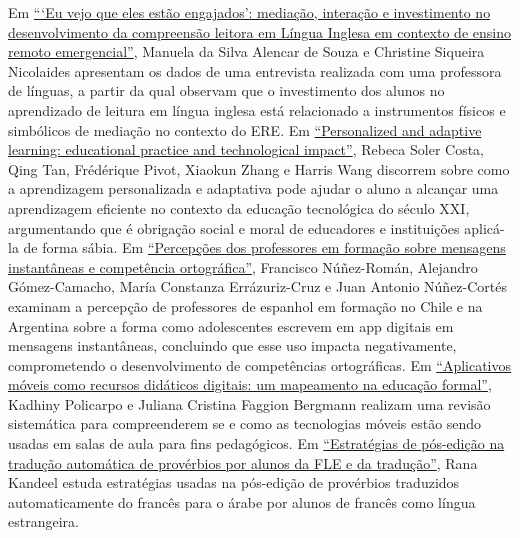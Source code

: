 \documentclass{textolivre}
\begin{document}
Em \href{https://doi.org/10.35699/1983-3652.2021.32572}{“‘Eu vejo que eles estão engajados’: mediação, interação e investimento no desenvolvimento da compreensão leitora em Língua Inglesa em contexto de ensino remoto emergencial”}, Manuela da Silva Alencar de Souza e Christine Siqueira Nicolaides apresentam os dados de uma entrevista realizada com uma professora de línguas, a partir da qual observam que o investimento dos alunos no aprendizado de leitura em língua inglesa está relacionado a instrumentos físicos e simbólicos de mediação no contexto do ERE. Em \href{https://doi.org/10.35699/1983-3652.2021.33445}{“Personalized and adaptive learning: educational practice and technological impact”}, Rebeca Soler Costa, Qing Tan, Frédérique Pivot, Xiaokun Zhang e Harris Wang discorrem sobre como a aprendizagem personalizada e adaptativa pode ajudar o aluno a alcançar uma aprendizagem eficiente no contexto da educação tecnológica do século XXI, argumentando que é obrigação social e moral de educadores e instituições aplicá-la de forma sábia. Em \href{https://doi.org/10.35699/1983-3652.2021.34141}{“Percepções dos professores em formação sobre mensagens instantâneas e competência ortográfica”}, Francisco Núñez-Román, Alejandro Gómez-Camacho, María Constanza Errázuriz-Cruz e Juan Antonio Núñez-Cortés examinam a percepção de professores de espanhol em formação no Chile e na Argentina sobre a forma como adolescentes escrevem em app digitais em mensagens instantâneas, concluindo que esse uso impacta negativamente, comprometendo o desenvolvimento de competências ortográficas. Em \href{https://doi.org/10.35699/1983-3652.2021.24923}{“Aplicativos móveis como recursos didáticos digitais: um mapeamento na educação formal”}, Kadhiny Policarpo e Juliana Cristina Faggion Bergmann realizam uma revisão sistemática para compreenderem se e como as tecnologias móveis estão sendo usadas em salas de aula para fins pedagógicos. Em \href{https://doi.org/10.35699/1983-3652.2021.29459}{“Estratégias de pós-edição na tradução automática de provérbios por alunos da FLE e da tradução”}, Rana Kandeel estuda estratégias usadas na pós-edição de provérbios traduzidos automaticamente do francês para o árabe por alunos de francês como língua estrangeira. 
\end{document}
